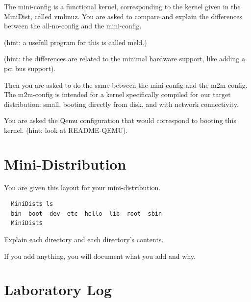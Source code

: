 \documentclass[10]{article}
\begin{document}
The mini-config is a functional kernel, corresponding to the
kernel given in the MiniDist, called vmlinuz. You are asked
to compare and explain the differences between the all-no-config
and the mini-config. 

\noindent (hint: a usefull program for this is called meld.)

\noindent (hint: the differences are related to the minimal
hardware support, like adding a pci bus support).

Then you are asked to do the same between the mini-config
and the m2m-config. The m2m-config is intended for a kernel
specifically compiled for our target distribution: small,
booting directly from disk, and with network connectivity.

You are asked the Qemu configuration that would correspond
to booting this kernel. (hint: look at README-QEMU).


\section{Mini-Distribution}

You are given this layout for your mini-distribution.
{\em\small 
\begin{verbatim}
  MiniDist$ ls
  bin  boot  dev  etc  hello  lib  root  sbin
  MiniDist$
\end{verbatim}
}

Explain each directory and each directory's contents.

If you add anything, you will document what you add and why.

\section{Laboratory Log}
\end{document}
